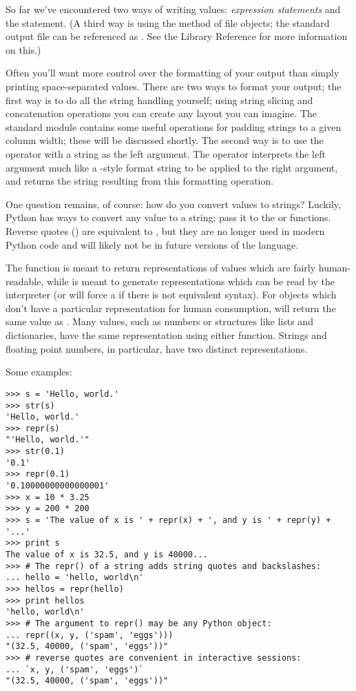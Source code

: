 \documentclass{manual}
\begin{document}
So far we've encountered two ways of writing values: \emph{expression
statements} and the  statement.  (A third way is using
the  method of file objects; the standard output file
can be referenced as .  See the Library Reference for
more information on this.)

Often you'll want more control over the formatting of your output than
simply printing space-separated values.  There are two ways to format
your output; the first way is to do all the string handling yourself;
using string slicing and concatenation operations you can create any
layout you can imagine.  The standard module
 contains some useful operations
for padding strings to a given column width; these will be discussed
shortly.  The second way is to use the \code{\%} operator with a
string as the left argument.  The \code{\%} operator interprets the
left argument much like a -style format
string to be applied to the right argument, and returns the string
resulting from this formatting operation.

One question remains, of course: how do you convert values to strings?
Luckily, Python has ways to convert any value to a string: pass it to
the   or  functions.  Reverse quotes
() are equivalent to , but they are no
longer used in modern Python code and will likely not be in future
versions of the language.

The  function is meant to return representations of
values which are fairly human-readable, while  is
meant to generate representations which can be read by the interpreter
(or will force a  if there is not equivalent
syntax).  For objects which don't have a particular representation for
human consumption,  will return the same value as
.  Many values, such as numbers or structures like
lists and dictionaries, have the same representation using either
function.  Strings and floating point numbers, in particular, have two
distinct representations.

Some examples:

\begin{verbatim}
>>> s = 'Hello, world.'
>>> str(s)
'Hello, world.'
>>> repr(s)
"'Hello, world.'"
>>> str(0.1)
'0.1'
>>> repr(0.1)
'0.10000000000000001'
>>> x = 10 * 3.25
>>> y = 200 * 200
>>> s = 'The value of x is ' + repr(x) + ', and y is ' + repr(y) + '...'
>>> print s
The value of x is 32.5, and y is 40000...
>>> # The repr() of a string adds string quotes and backslashes:
... hello = 'hello, world\n'
>>> hellos = repr(hello)
>>> print hellos
'hello, world\n'
>>> # The argument to repr() may be any Python object:
... repr((x, y, ('spam', 'eggs')))
"(32.5, 40000, ('spam', 'eggs'))"
>>> # reverse quotes are convenient in interactive sessions:
... `x, y, ('spam', 'eggs')`
"(32.5, 40000, ('spam', 'eggs'))"
\end{verbatim}
\end{document}
